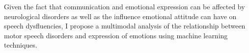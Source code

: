Given the fact that communication and emotional expression can be affected by neurological disorders as well as the influence emotional attitude can have on speech dysfluencies, I propose a multimodal analysis of the relationship between motor speech disorders and expression of emotions using machine learning techniques.






\begin{comment} 
Although during conversations major attention is given to the spoken content, non-verbal communication processing occurs subconsciously. Besides the verbal content of speech, it contains also non-verbal elements known as paralanguage: voice quality, rate, pitch, volume, and speaking style, prosodic features such as rhythm, intonation, and stress. But there are additional visual cues part of the non-verbal communication, namely, body language (kinesics), distance (proxemics), oculesics (eye contact, patterns of fixation, etc.), and touch (haptics). Together with paralanguage, non-verbal communication make two thirds of communication \cite{Burgoon2016}.

As such an important part of communication is visual, the goal of this thesis is to collect RGB and depth video data related to communication, analyze and detect different communication features by applying image processing techniques as well as machine learning. For that purpose different study cases have been carefully selected:
\begin{enumerate}
    \item \textbf{Speech and Language Therapy}: evaluation of oromotoric exercises performed by children with lisp problems in context of the project BioVisualSpeech.
    \item \textbf{Affective computing}: detecting and recognizing emotional states of humans.
    \item \textbf{Facial paralysis}: detect and quantify the severity of facial paralysis \cite{Ngo2016}\cite{Sundaraj2012}.
\end{enumerate}

Study case 1) is part of an international project called BioVisualSpeech in which this thesis is part of. In Fig.\ref{fig:project} an overview of the project, which aims to collect data from children with speech disorders, is provided. The project is composed by three main components: a) data acquisition using interactive games, b) Data analysis, and c) health information system. The goal of BioVisualSpeech is to develop a system that is composed by the three mentioned components in order to support speech therapists (more details in chapter \ref{sec:motivation}). During this thesis the focus lies on RGB and depth video processing, annotation extraction and development of a system which uses machine learning techniques to find similar patients and suggest therapy exercises. 


\end{comment}
